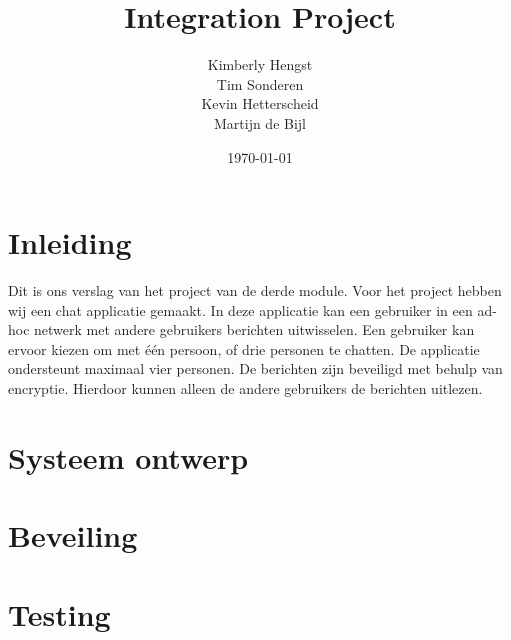 \documentclass{article}
\title{Integration Project}
\author{Kimberly Hengst \\ Tim Sonderen \\ Kevin Hetterscheid \\ Martijn de Bijl}
\date{\today}
\begin{document}
\maketitle

\newpage

\tableofcontents

\section{Inleiding}
Dit is ons verslag van het project van de derde module. Voor het project hebben wij een chat applicatie gemaakt. In deze applicatie kan een gebruiker in een ad-hoc netwerk met andere gebruikers berichten uitwisselen. Een gebruiker kan ervoor kiezen om met één persoon, of drie personen te chatten. De applicatie ondersteunt maximaal vier personen. De berichten zijn beveiligd met behulp van encryptie. Hierdoor kunnen alleen de andere gebruikers de berichten uitlezen. 

\newpage

\section{Systeem ontwerp}

\section{Beveiling}

\section{Testing}
\end{document}
